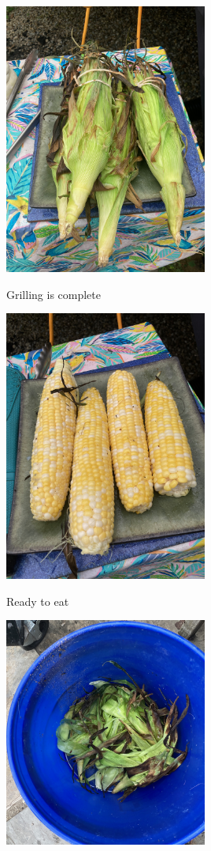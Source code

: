 \documentclass[
]{book}
\begin{document}
\includegraphics[width=0.5\textwidth,height=\textheight]{images/Corn1.jpeg}

Grilling is complete

\includegraphics[width=0.5\textwidth,height=\textheight]{images/corn2.jpeg}

Ready to eat

\includegraphics[width=0.5\textwidth,height=\textheight]{images/husks.jpeg}
\end{document}
